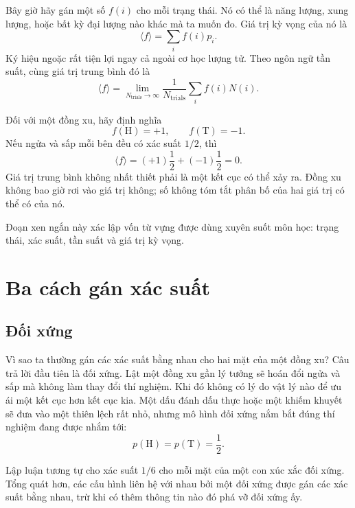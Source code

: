 Bây giờ hãy gán một số \(f(i)\) cho mỗi trạng thái. Nó có thể là năng lượng, xung lượng, hoặc bất kỳ đại lượng nào khác mà ta muốn đo. Giá trị kỳ vọng của nó là
\begin{equation}
 \langle f\rangle=\sum_i f(i)p_i.
 \label{eq:sm1-expectation}
\end{equation}
Ký hiệu ngoặc rất tiện lợi ngay cả ngoài cơ học lượng tử. Theo ngôn ngữ tần suất, cùng giá trị trung bình đó là
\begin{equation}
 \langle f\rangle
 =
 \lim_{N_{\mathrm{trials}}\to\infty}
 \frac{1}{N_{\mathrm{trials}}}
 \sum_i f(i)N(i).
 \label{eq:sm1-frequency-average}
\end{equation}

Đối với một đồng xu, hãy định nghĩa
\begin{equation}
 f(\mathrm{H})=+1,
 \qquad
 f(\mathrm{T})=-1.
\end{equation}
Nếu ngửa và sấp mỗi bên đều có xác suất \(1/2\), thì
\begin{equation}
 \langle f\rangle
 =(+1)\frac12+(-1)\frac12=0.
\end{equation}
Giá trị trung bình không nhất thiết phải là một kết cục có thể xảy ra. Đồng xu không bao giờ rơi vào giá trị không; số không tóm tắt phân bố của hai giá trị có thể có của nó.

Đoạn xen ngắn này xác lập vốn từ vựng được dùng xuyên suốt môn học: trạng thái, xác suất, tần suất và giá trị kỳ vọng.

\section{Ba cách gán xác suất}

\subsection{Đối xứng}

Vì sao ta thường gán các xác suất bằng nhau cho hai mặt của một đồng xu? Câu trả lời đầu tiên là đối xứng. Lật một đồng xu gần lý tưởng sẽ hoán đổi ngửa và sấp mà không làm thay đổi thí nghiệm. Khi đó không có lý do vật lý nào để ưu ái một kết cục hơn kết cục kia. Một dấu đánh dấu thực hoặc một khiếm khuyết sẽ đưa vào một thiên lệch rất nhỏ, nhưng mô hình đối xứng nắm bắt đúng thí nghiệm đang được nhắm tới:
\begin{equation}
 p(\mathrm{H})=p(\mathrm{T})=\frac12.
\end{equation}

Lập luận tương tự cho xác suất \(1/6\) cho mỗi mặt của một con xúc xắc đối xứng. Tổng quát hơn, các cấu hình liên hệ với nhau bởi một đối xứng được gán các xác suất bằng nhau, trừ khi có thêm thông tin nào đó phá vỡ đối xứng ấy.

